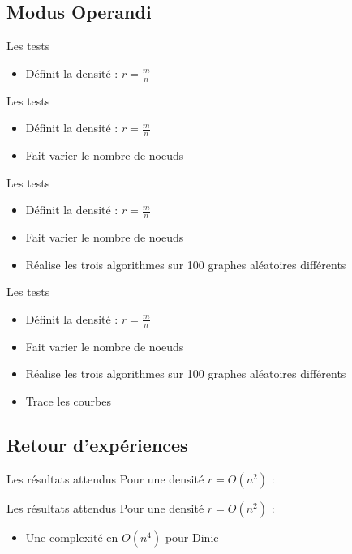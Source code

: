 \subsection{Modus Operandi}

\begin{frame}{Les tests}
	\begin{itemize}
		\item Définit la densité : $r = \frac{m}{n}$
	\end{itemize}
\end{frame}

\begin{frame}{Les tests}
	\begin{itemize}
		\item Définit la densité : $r = \frac{m}{n}$
		\item Fait varier le nombre de noeuds
	\end{itemize}
\end{frame}
\begin{frame}{Les tests}
	\begin{itemize}
		\item Définit la densité : $r = \frac{m}{n}$
		\item Fait varier le nombre de noeuds
		\item Réalise les trois algorithmes sur 100 graphes aléatoires différents
	\end{itemize}
\end{frame}
\begin{frame}{Les tests}
	\begin{itemize}
		\item Définit la densité : $r = \frac{m}{n}$
		\item Fait varier le nombre de noeuds
		\item Réalise les trois algorithmes sur 100 graphes aléatoires différents
		\item Trace les courbes
	\end{itemize}
\end{frame}

\subsection{Retour d'expériences}

\begin{frame}{Les résultats attendus}
	Pour une densité $r = O(n^2)$ : 
\end{frame}

\begin{frame}{Les résultats attendus}
	Pour une densité $r = O(n^2)$ : \begin{itemize}
		\item Une complexité en $O(n^4)$ pour Dinic
	\end{itemize}
\end{frame}

